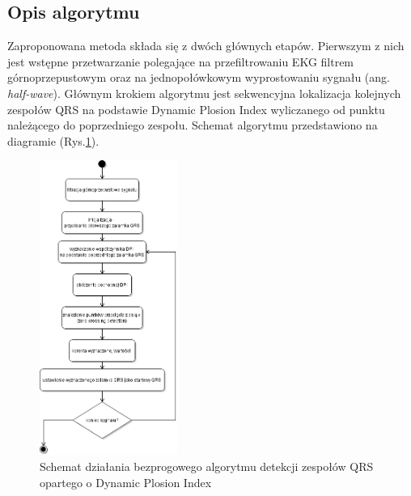 \documentclass[10pt,a4paper]{article}
\begin{document}
\subsection{Opis algorytmu}
Zaproponowana metoda \cite{dpi_qrs} składa się z dwóch głównych etapów. Pierwszym z nich jest wstępne przetwarzanie polegające na przefiltrowaniu EKG filtrem górnoprzepustowym oraz na jednopołówkowym wyprostowaniu sygnału (ang. \textit{half-wave}). Głównym krokiem algorytmu jest sekwencyjna lokalizacja kolejnych zespołów QRS na podstawie Dynamic Plosion Index wyliczanego od punktu należącego do poprzedniego zespołu. Schemat algorytmu przedstawiono na diagramie (Rys.\ref{schema}).
\begin{figure}[h]
    \centering
    \includegraphics[width=0.4\textwidth]{img/DPI_schema.png}
    \caption{Schemat działania bezprogowego algorytmu detekcji zespołów QRS opartego o Dynamic Plosion Index}
    \label{schema}
\end{figure}
\end{document}
